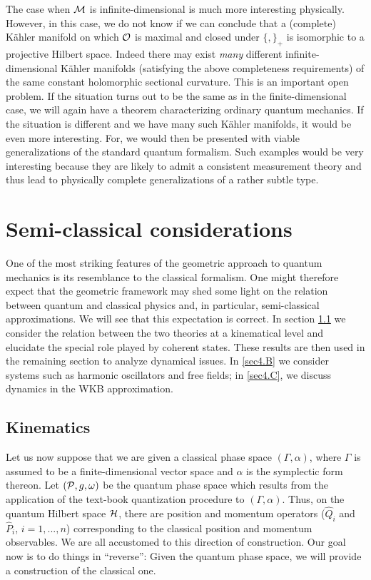 \documentclass[12pt,aps,eqsecnum,tighten]{revtex4-2}
\def\a{\alpha}
\def\H{{\cal H}}
\def\P{{\cal P}}
\def\M{{\cal M}}
\def\w{\omega}
\begin{document}
The case when $\M$ is infinite-dimensional is much more interesting
physically. However, in this case, we do not know if we can conclude
that a (complete) K\"ahler manifold on which ${\cal O}$ is maximal and
closed under $\{ , \}_+$ is isomorphic to a projective Hilbert space.
Indeed there may exist {\em many} different infinite-dimensional
K\"ahler manifolds (satisfying the above completeness requirements) of
the same constant holomorphic sectional curvature. This is an
important open problem. If the situation turns out to be the same as
in the finite-dimensional case, we will again have a theorem
characterizing ordinary quantum mechanics. If the situation is
different and we have many such K\"ahler manifolds, it would be even
more interesting. For, we would then be presented with viable
generalizations of the standard quantum formalism. Such examples would
be very interesting because they are likely to admit a consistent
measurement theory and thus lead to physically complete
generalizations of a rather subtle type.


\section{Semi-classical considerations} \label{sec4}

One of the most striking features of the geometric approach to quantum
mechanics is its resemblance to the classical formalism. One might
therefore expect that the geometric framework may shed some light on
the relation between quantum and classical physics and, in particular,
semi-classical approximations. We will see that this expectation is
correct. In section \ref{sec4.A} we consider the relation between the
two theories at a kinematical level and elucidate the special role
played by coherent states. These results are then used in the
remaining section to analyze dynamical issues. In \ref{sec4.B} we
consider systems such as harmonic oscillators and free fields; in
\ref{sec4.C}, we discuss dynamics in the WKB approximation.

 
\subsection{Kinematics} \label{sec4.A}

Let us now suppose that we are given a classical phase space $(\Gamma,
\a)$, where $\Gamma$ is assumed to be a finite-dimensional vector
space and $\a$ is the symplectic form thereon. Let $(\P, g, \w)$ be
the quantum phase space which results from the application of the
text-book quantization procedure to $(\Gamma, \a)$. Thus, on the
quantum Hilbert space $\H$, there are position and momentum operators
($\hat{Q}_i$ and $\hat{P}_i$, $i=1, ..., n$) corresponding to the
classical position and momentum observables.  We are all accustomed to
this direction of construction. Our goal now is to do things in
``reverse'': Given the quantum phase space, we will provide a
construction of the classical one.
\end{document}
